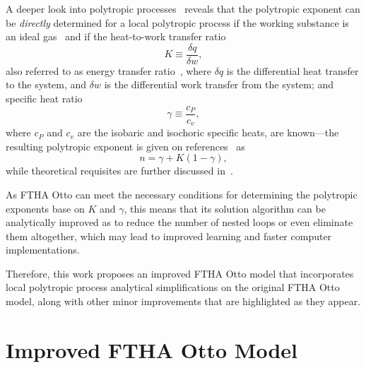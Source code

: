     A deeper look into polytropic processes~\cite{2012-ChristiansJ-IntJMechEngEduc, 2020-NaaktgeborenC-Polytropic-engrXiv-rev02}
    reveals that the polytropic exponent can be \emph{directly} determined  for  a  local  polytropic  process  if  the  working
    substance is an ideal gas~\cite{2020-NaaktgeborenC-Polytropic-engrXiv-rev02} and if the heat-to-work transfer ratio%
    \begin{equation}
        K \equiv \frac{\delta q}{\delta w},
        \label{eq:def.K}
    \end{equation}
    \noindent also referred to as  energy  transfer  ratio~\cite{2012-ChristiansJ-IntJMechEngEduc},  where  $\delta  q$  is  the
    differential heat transfer to the system, and $\delta w$ is the differential work transfer from  the  system;  and  specific
    heat ratio%
    \begin{equation}
        \gamma \equiv \frac{c_P}{c_v},
        \label{eq:def.gamma}
    \end{equation}
    \noindent where $c_P$ and $c_v$ are the isobaric and isochoric specific heats, are known---the resulting polytropic exponent
    is   given   on   references~\cite{2012-ChristiansJ-IntJMechEngEduc,   2020-NaaktgeborenC-Polytropic-engrXiv-rev02} as%
    \begin{equation}
        n = \gamma + K(1 - \gamma),
        \label{eq:n}
    \end{equation}
    \noindent while
    theoretical requisites are further discussed in~\cite{2020-NaaktgeborenC-Polytropic-engrXiv-rev02}.

    As FTHA Otto can meet the necessary conditions for determining the polytropic exponents base on $K$ and $\gamma$, this means
    that its solution algorithm can be analytically improved as to reduce the number of nested  loops  or  even  eliminate  them
    altogether, which may lead to improved learning and faster computer implementations.

    Therefore, this  work  proposes  an  improved  FTHA  Otto  model  that  incorporates  local  polytropic  process  analytical
    simplifications on the original FTHA Otto model, along with other minor improvements that are highlighted as they appear.



\section{Improved FTHA Otto Model}



